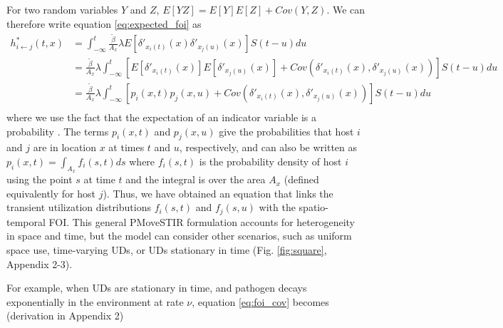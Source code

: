 \documentclass[letterpaper]{article}
\begin{document}
For two random variables $Y$ and $Z$, $E[YZ] = E[Y]E[Z] + Cov(Y, Z)$.  We can therefore write equation \ref{eq:expected_foi} as
\begin{equation}
    \begin{aligned}
        h^*_{i \leftarrow j}(t, x) &= \int_{-\infty}^{t} \frac{\tilde{\beta}}{A_x} \lambda E[\delta'_{x_i(t)}(x) \delta'_{x_j(u)}(x)] S(t - u) du \\
        &= \frac{\tilde{\beta}}{A_x} \lambda \int_{-\infty}^{t} [E[\delta'_{x_i(t)}(x)] E[\delta'_{x_j(u)}(x)] + Cov(\delta'_{x_i(t)}(x), \delta'_{x_j(u)}(x))] S(t - u) du \\
        &= \frac{\tilde{\beta}}{A_x} \lambda \int_{-\infty}^{t} [p_i(x, t) p_j(x, u) + Cov(\delta'_{x_i(t)}(x), \delta'_{x_j(u)}(x))] S(t - u) du \\
    \end{aligned}
    \label{eq:foi_cov}
\end{equation}
where we use the fact that the expectation of an indicator variable is a probability \citep{Grimmett2001}. The terms $p_i(x, t)$ and $p_j(x,u)$ give the probabilities that host $i$ and $j$ are in location $x$ at times $t$ and $u$, respectively, and can also be written as $p_i(x, t) = \int_{A_x} f_i(s, t) ds$ where $f_i(s, t)$ is the probability density of host $i$ using the point $s$ at time $t$ and the integral is over the area $A_x$ (defined equivalently for host $j$). Thus, we have obtained an equation that links the transient utilization distributions $f_i(s, t)$ and $f_j(s, u)$ with the spatio-temporal FOI.
This general PMoveSTIR formulation accounts for heterogeneity in space and time, but the model can consider other scenarios, such as uniform space use, time-varying UDs, or UDs stationary in time (Fig. \ref{fig:square}, Appendix 2-3). 

For example, when UDs are stationary in time, and pathogen decays exponentially in the environment at rate $\nu$, equation \ref{eq:foi_cov} becomes (derivation in Appendix 2)
\end{document}
